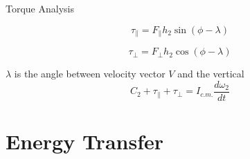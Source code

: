 \documentclass[tikz]{beamer}
\begin{document}
\begin{frame} {Torque Analysis}
	\only<3> {
		\begin{equation}
			\tau_{\parallel} = F_{\parallel} h_2 \sin{(\phi - \lambda)} \tag{12}
		\end{equation}

		\begin{equation}
			\tau_{\perp} = F_{\perp} h_2 \cos{(\phi - \lambda)} \tag{13}
		\end{equation}

		$\lambda$ is the angle between velocity vector $V$ and the vertical\\
		\vspace{\baselineskip}
		\begin{equation}
			C_2 + \tau_{\parallel} + \tau_{\perp} = I_{c.m.} \frac{d \omega_2}{dt} \tag{14}
		\end{equation}
	}
\end{frame}

\section{Energy Transfer}
\end{document}

